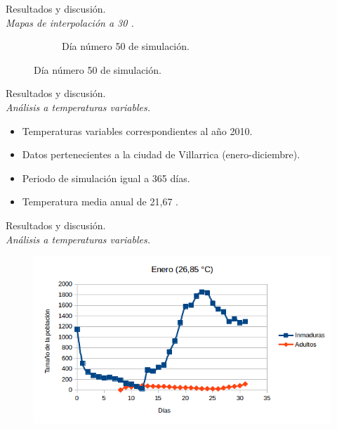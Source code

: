 \begin{frame}[t]{Resultados y discusión.\\\textit{Mapas de interpolación a 30 \textcelsius.}}
\begin{figure}
\begin{subfigure}[b]{0.45\textwidth}
        \caption{Día número 50 de simulación.}
    \end{subfigure}
    \end{figure}
\end{frame}


\begin{frame}[t]{Resultados y discusión.\\\textit{Análisis a temperaturas variables.}}
\begin{itemize}
    \item Temperaturas variables correspondientes al año 2010.
    \item Datos pertenecientes a la ciudad de Villarrica (enero-diciembre).
    \item Periodo de simulación igual a 365 días.
    \item Temperatura media anual de 21,67 \textcelsius.
    \end{itemize}
\end{frame}

\begin{frame}[t]{Resultados y discusión.\\\textit{Análisis a temperaturas variables.}}
    \begin{figure}
    \includegraphics[width=\textwidth]{./graphics/py-2010-enero.png}
    \end{figure}
\end{frame}

